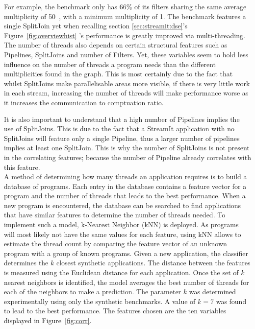 For example, the benchmark  only has 66\% of its filters sharing the same average multiplicity of 50~\cite{thiesStreamit2010}, with a minimum multiplicity of 1. 
The benchmark features a single SplitJoin yet when recalling section \ref{sec:streamit:dse}'s Figure~\ref{fig:overviewhist} 's performance is greatly improved via multi-threading.
The number of threads also depends on certain structural features such as Pipelines, SplitJoins and number of Filters.
Yet, these variables seem to hold less influence on the number of threads a program needs than the different multiplicities found in the graph.
This is most certainly due to the fact that whilst SplitJoins make parallelisable areas more visible, if there is very little work in each stream, increasing the number of threads will make performance worse as it increases the communication to comptuation ratio.

It is also important to understand that a high number of Pipelines implies the use of SplitJoins.
This is due to the fact that a StreamIt application with no SplitJoins will feature only a single Pipeline, thus a larger number of pipelines implies at least one SplitJoin.
This is why the number of SplitJoins is not present in the correlating features; because the number of Pipeline already correlates with this feature.\\

A method of determining how many threads an application requires is to build a database of programs.
Each entry in the database contains a feature vector for a program and the number of threads that leads to the best performance.
When a new program is encountered, the database can be searched to find applications that have similar features to determine the number of threads needed.
To implement such a model, k-Nearest Neighbor (kNN) is deployed.
As programs will most likely not have the same values for each feature, using kNN allows to estimate the thread count by comparing the feature vector of an unknown program with a group of known programs.
Given a new application, the classifier determines the $k$ closest synthetic applications.
The distance between the features is measured using the Euclidean distance for each application.
Once the set of $k$ nearest neighbors is identified, the model averages the best number of threads for each of the neighbors to make a prediction. 
The parameter $k$ was determined experimentally using only the synthetic benchmarks.
A value of $k=7$ was found to lead to the best performance.
The features chosen are the ten variables displayed in Figure~\ref{fig:corr}.

